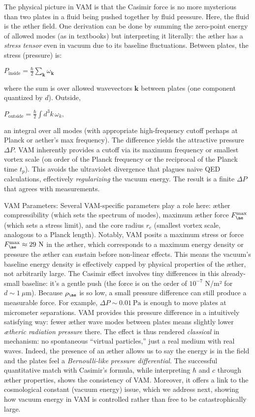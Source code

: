 \documentclass[a4paper, aps,preprint,superscriptaddress, 12pt]{revtex4}
\begin{document}
The physical picture in VAM is that the Casimir force is no more mysterious than two plates in a fluid being pushed together by fluid pressure. Here, the fluid is the æther field. One derivation can be done by summing the zero-point energy of allowed modes (as in textbooks) but interpreting it literally: the æther has a \textit{stress tensor} even in vacuum due to its baseline fluctuations. Between plates, the stress (pressure) is:

$P_{\text{inside}} = \frac{\hbar}{2}\sum_{\mathbf{k}}\omega_{\mathbf{k}}$

where the sum is over allowed wavevectors $\mathbf{k}$ between plates (one component quantized by $d$). Outside,

$P_{\text{outside}} = \frac{\hbar}{2}\int d^3k\,\omega_{k},$

an integral over all modes (with appropriate high-frequency cutoff perhaps at Planck or aether’s max frequency). The difference yields the attractive pressure $\Delta P$. VAM inherently provides a cutoff via its maximum frequency or smallest vortex scale (on order of the Planck frequency or the reciprocal of the Planck time $t_p$). This avoids the ultraviolet divergence that plagues naive QED calculations, effectively \textit{regularizing} the vacuum energy. The result is a finite $\Delta P$ that agrees with measurements.


VAM Parameters: Several VAM-specific parameters play a role here: æther compressibility (which sets the spectrum of modes), maximum æther force $F_{\ae}^{\max}$ (which sets a stress limit), and the core radius $r_c$ (smallest vortex scale, analogous to a Planck length). Notably, VAM posits a maximum stress or force $F_{\ae}^{\max}\approx29~\text{N}$ in the æther, which corresponds to a maximum energy density or pressure the æther can sustain before non-linear effects. This means the vacuum’s baseline energy density is effectively capped by physical properties of the æther, not arbitrarily large. The Casimir effect involves tiny differences in this already-small baseline: it’s a gentle push (the force is on the order of $10^{-7}$ N/m² for $d\sim1~\mu$m). Because $\rho_{\ae}$ is so low, a small pressure difference can still produce a measurable force. For example, $\Delta P \sim 0.01~\text{Pa}$ is enough to move plates at micrometer separations. VAM provides this pressure difference in a intuitively satisfying way: fewer æther wave modes between plates means slightly lower \textit{ætheric radiation pressure} there. The effect is thus rendered \textit{classical} in mechanism: no spontaneous “virtual particles,” just a real medium with real waves. Indeed, the presence of an æther allows us to say the energy is in the field and the plates feel a \textit{Bernoulli-like pressure differential}. The successful quantitative match with Casimir’s formula, while interpreting $\hbar$ and $c$ through æther properties, shows the consistency of VAM. Moreover, it offers a link to the cosmological constant (vacuum energy) issue, which we address next, showing how vacuum energy in VAM is controlled rather than free to be catastrophically large.
\end{document}
